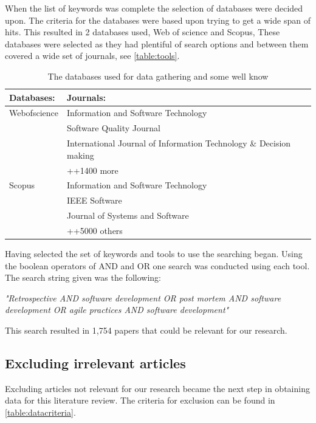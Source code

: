 \documentclass[12pt]{article}
\begin{document}
When the list of keywords was complete the selection of databases were decided upon. The criteria for the databases were based upon trying to get a wide span of hits. This resulted in 2 databases used, Web of science and Scopus, These databases were selected as they had plentiful of search options and between them covered a wide set of journals, see \autoref{table:tools}. 

\begin{table}[!h]
	\begin{center}
		\caption{The databases used for data gathering and some well know}
		\label{table:tools}
		\begin{tabular}{ l | p{}}
			Databases: & Journals: \\ \hline
			Webofscience & Information and Software Technology \\ 
			& Software Quality Journal \\
			& International Journal of Information Technology \& Decision making \\
			& ++1400 more \\
			\hline
			Scopus & Information and Software Technology \\ 
			& IEEE Software\\
			& Journal of Systems and Software \\
			& ++5000 others \\
		\end{tabular}
	\end{center}
\end{table}
			
Having selected the set of keywords and tools to use the searching began. Using the boolean operators of AND and OR one search was conducted using each tool. The search string given was the following: 
\begin{center}
	\emph{"Retrospective AND software development OR post mortem AND software development OR agile practices AND software development"}
\end{center}
This search resulted in 1,754 papers that could be relevant for our research.

\subsection{Excluding irrelevant articles}
Excluding articles not relevant for our research became the next step in obtaining data for this literature review. The criteria for exclusion can be found in \autoref{table:datacriteria}. \\
\end{document}
